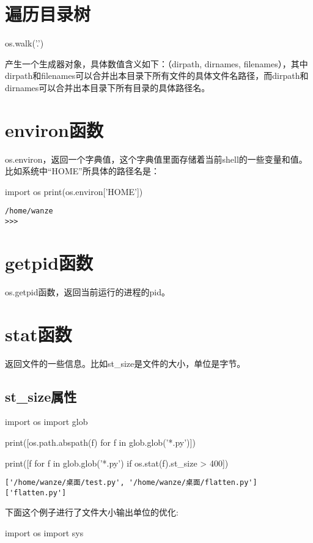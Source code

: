 \documentclass[12pt,oneside]{book}
\begin{document}
\begin{common-format}
\section{遍历目录树}
\begin{tcbpython}[]
os.walk('.')
\end{tcbpython}

产生一个生成器对象，具体数值含义如下：（dirpath, dirnames, filenames），其中dirpath和filenames可以合并出本目录下所有文件的具体文件名路径，而dirpath和dirnames可以合并出本目录下所有目录的具体路径名。

\section{environ函数}
os.environ，返回一个字典值，这个字典值里面存储着当前shell的一些变量和值。比如系统中“HOME”所具体的路径名是：
\begin{tcbpython}[]
import os
print(os.environ['HOME'])
\end{tcbpython}
\begin{Verbatim}
/home/wanze
>>> 
\end{Verbatim}

\section{getpid函数}
os.getpid函数，返回当前运行的进程的pid。

\section{stat函数}
返回文件的一些信息。比如st\_{}size是文件的大小，单位是字节。


\subsection{st\_{}size属性}
\begin{tcbpython}[]
import os
import glob

print([os.path.abspath(f) for f in glob.glob('*.py')])

print([f for f in glob.glob('*.py') if os.stat(f).st_size > 400])
\end{tcbpython}
\begin{Verbatim}
['/home/wanze/桌面/test.py', '/home/wanze/桌面/flatten.py']
['flatten.py']
\end{Verbatim}

下面这个例子进行了文件大小输出单位的优化: 
\begin{tcbpython}[]
import os
import sys


\end{tcbpython}
\end{common-format}
\end{document}
